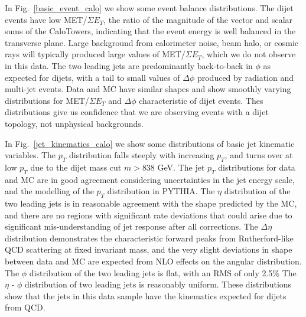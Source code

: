 In Fig.~\ref{basic_event_calo} we show some event balance distributions.
The dijet events have low MET/$\Sigma E_T$, the ratio of the magnitude
of the vector and scalar sums of the CaloTowers, indicating that the
event energy is well balanced in the transverse plane.  Large
background from calorimeter noise, beam halo, or cosmic rays will
typically produced large values of MET/$\Sigma E_T$, which we do not
observe in this data.
The two leading jets are predominantly back-to-back in $\phi$ as
expected for dijets, with a tail to small values of $\Delta\phi$ 
produced by radiation and multi-jet events.
Data and MC have similar shapes and show smoothly varying distributions
for MET/$\Sigma E_T$ and $\Delta\phi$ characteristic of dijet events.
Thes distributions give us confidence that we are observing events with
a dijet topology, not unphysical backgrounds.

In Fig.~\ref{jet_kinematics_calo} we show some distributions of basic jet
kinematic variables.  The $p_T$ distribution falls steeply with
increasing $p_T$, and turns over at low $p_T$ due to the dijet mass
cut $m>838$ GeV.  The jet $p_T$ distributions for data and MC are in
good agreement considering uncertainties in the jet energy scale,
and the modelling of the $p_T$
distribution in PYTHIA.  The $\eta$ distribution of the two leading
jets is in reasonable agreement with the shape predicted by the MC,
and there are no regions with significant rate deviations that could
arise due to significant mis-understanding of jet response after all
corrections. The $\Delta\eta$ distribution demonstrates the
characteristic forward peaks from Rutherford-like QCD scattering at
fixed invariant mass, and the very slight deviations in shape between
data and MC are expected from NLO effects on the angular distribution.
The $\phi$ distribution of the two leading jets is flat, with an RMS
of only 2.5\%
 The $\eta$ -
$\phi$ distribution of two leading jets is reasonably uniform.
These distributions show that the jets in this data sample have the
kinematics expected for dijets from QCD.

